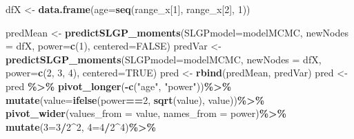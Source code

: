 \documentclass[
]{article}
\newenvironment{Shaded}{\begin{snugshade}}{\end{snugshade}}
\newcommand{\AttributeTok}[1]{\textcolor[rgb]{0.13,0.29,0.53}{#1}}
\newcommand{\ConstantTok}[1]{\textcolor[rgb]{0.56,0.35,0.01}{#1}}
\newcommand{\DecValTok}[1]{\textcolor[rgb]{0.00,0.00,0.81}{#1}}
\newcommand{\FunctionTok}[1]{\textcolor[rgb]{0.13,0.29,0.53}{\textbf{#1}}}
\newcommand{\NormalTok}[1]{#1}
\newcommand{\OtherTok}[1]{\textcolor[rgb]{0.56,0.35,0.01}{#1}}
\newcommand{\SpecialCharTok}[1]{\textcolor[rgb]{0.81,0.36,0.00}{\textbf{#1}}}
\newcommand{\StringTok}[1]{\textcolor[rgb]{0.31,0.60,0.02}{#1}}
\begin{document}
\begin{Shaded}
\begin{Highlighting}[]
\NormalTok{dfX }\OtherTok{\textless{}{-}} \FunctionTok{data.frame}\NormalTok{(}\AttributeTok{age=}\FunctionTok{seq}\NormalTok{(range\_x[}\DecValTok{1}\NormalTok{], range\_x[}\DecValTok{2}\NormalTok{], }\DecValTok{1}\NormalTok{))}

\NormalTok{predMean }\OtherTok{\textless{}{-}} \FunctionTok{predictSLGP\_moments}\NormalTok{(}\AttributeTok{SLGPmodel=}\NormalTok{modelMCMC,}
                                \AttributeTok{newNodes =}\NormalTok{ dfX, }
                                \AttributeTok{power=}\FunctionTok{c}\NormalTok{(}\DecValTok{1}\NormalTok{),}
                                \AttributeTok{centered=}\ConstantTok{FALSE}\NormalTok{)}
\NormalTok{predVar }\OtherTok{\textless{}{-}} \FunctionTok{predictSLGP\_moments}\NormalTok{(}\AttributeTok{SLGPmodel=}\NormalTok{modelMCMC,}
                               \AttributeTok{newNodes =}\NormalTok{ dfX, }
                               \AttributeTok{power=}\FunctionTok{c}\NormalTok{(}\DecValTok{2}\NormalTok{, }\DecValTok{3}\NormalTok{, }\DecValTok{4}\NormalTok{), }
                               \AttributeTok{centered=}\ConstantTok{TRUE}\NormalTok{)}
\NormalTok{pred }\OtherTok{\textless{}{-}} \FunctionTok{rbind}\NormalTok{(predMean, predVar)}
\NormalTok{pred }\OtherTok{\textless{}{-}}\NormalTok{ pred }\SpecialCharTok{\%\textgreater{}\%}
  \FunctionTok{pivot\_longer}\NormalTok{(}\SpecialCharTok{{-}}\FunctionTok{c}\NormalTok{(}\StringTok{"age"}\NormalTok{, }\StringTok{"power"}\NormalTok{))}\SpecialCharTok{\%\textgreater{}\%}
  \FunctionTok{mutate}\NormalTok{(}\AttributeTok{value=}\FunctionTok{ifelse}\NormalTok{(power}\SpecialCharTok{==}\DecValTok{2}\NormalTok{, }\FunctionTok{sqrt}\NormalTok{(value), value))}\SpecialCharTok{\%\textgreater{}\%}
  \FunctionTok{pivot\_wider}\NormalTok{(}\AttributeTok{values\_from =}\NormalTok{ value,}
              \AttributeTok{names\_from =}\NormalTok{ power)}\SpecialCharTok{\%\textgreater{}\%}
  \FunctionTok{mutate}\NormalTok{(}\StringTok{\textasciigrave{}}\AttributeTok{3}\StringTok{\textasciigrave{}}\OtherTok{=}\StringTok{\textasciigrave{}}\AttributeTok{3}\StringTok{\textasciigrave{}}\SpecialCharTok{/}\StringTok{\textasciigrave{}}\AttributeTok{2}\StringTok{\textasciigrave{}}\SpecialCharTok{\^{}}\DecValTok{2}\NormalTok{,}
         \StringTok{\textasciigrave{}}\AttributeTok{4}\StringTok{\textasciigrave{}}\OtherTok{=}\StringTok{\textasciigrave{}}\AttributeTok{4}\StringTok{\textasciigrave{}}\SpecialCharTok{/}\StringTok{\textasciigrave{}}\AttributeTok{2}\StringTok{\textasciigrave{}}\SpecialCharTok{\^{}}\DecValTok{4}\NormalTok{)}\SpecialCharTok{\%\textgreater{}\%}

\end{Highlighting}
\end{Shaded}
\end{document}
